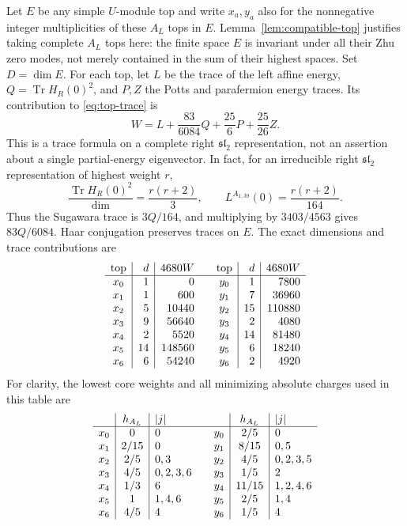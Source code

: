 \documentclass[11pt,a4paper]{article}
\theoremstyle{definition}
\begin{document}
Let $E$ be any simple $U$-module top and write $x_a,y_a$ also for the
nonnegative integer multiplicities of these $A_L$ tops in $E$.
Lemma~\ref{lem:compatible-top} justifies taking complete $A_L$ tops
here: the finite space $E$ is invariant under all their Zhu zero modes,
not merely contained in the sum of their highest spaces.
Set $D=\dim E$. For each top, let $L$ be the trace of the left affine
energy, $Q=\operatorname{Tr}H_R(0)^2$, and $P,Z$ the Potts and
parafermion energy traces. Its contribution to \eqref{eq:top-trace} is
\begin{equation}
 W=L+\frac{83}{6084}Q+\frac{25}{6}P+\frac{25}{26}Z.
 \label{eq:top-W}
\end{equation}
This is a trace formula on a complete right $\mathfrak{sl}_2$
representation, not an assertion about a single partial-energy
eigenvector. In fact, for an irreducible right $\mathfrak{sl}_2$
representation of highest weight $r$,
\[
 \frac{\operatorname{Tr}H_R(0)^2}{\dim}=\frac{r(r+2)}3,
 \qquad L^{A_{1,39}}(0)=\frac{r(r+2)}{164}.
\]
Thus the Sugawara trace is $3Q/164$, and multiplying by $3403/4563$
gives $83Q/6084$. Haar conjugation preserves traces on $E$.
The exact dimensions and trace contributions are
\[
\begin{array}{c|r|r@{\qquad}c|r|r}
 \text{top}&d&4680W&\text{top}&d&4680W\\\hline
 x_0&1&0&y_0&1&7800\\
 x_1&1&600&y_1&7&36960\\
 x_2&5&10440&y_2&15&110880\\
 x_3&9&56640&y_3&2&4080\\
 x_4&2&5520&y_4&14&81480\\
 x_5&14&148560&y_5&6&18240\\
 x_6&6&54240&y_6&2&4920
\end{array}
\]
For clarity, the lowest core weights and all minimizing absolute
charges used in this table are
\[
\begin{array}{c|c|l@{\qquad}c|c|l}
 &h_{A_L}&|j|&&h_{A_L}&|j|\\\hline
 x_0&0&0&y_0&2/5&0\\
 x_1&2/15&0&y_1&8/15&0,5\\
 x_2&2/5&0,3&y_2&4/5&0,2,3,5\\
 x_3&4/5&0,2,3,6&y_3&1/5&2\\
 x_4&1/3&6&y_4&11/15&1,2,4,6\\
 x_5&1&1,4,6&y_5&2/5&1,4\\
 x_6&4/5&4&y_6&1/5&4
\end{array}
\]
\end{document}

